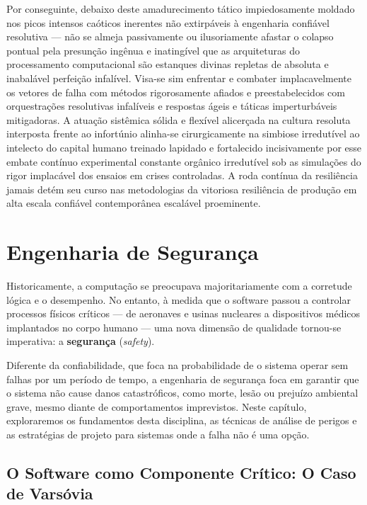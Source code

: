 \documentclass[12pt,a4paper]{report}
\begin{document}
Por conseguinte, debaixo deste amadurecimento tático impiedosamente moldado nos picos intensos caóticos inerentes não extirpáveis à engenharia confiável resolutiva — não se almeja passivamente ou ilusoriamente afastar o colapso pontual pela presunção ingênua e inatingível que as arquiteturas do processamento computacional são estanques divinas repletas de absoluta e inabalável perfeição infalível. Visa-se sim enfrentar e combater implacavelmente os vetores de falha com métodos rigorosamente afiados e preestabelecidos com orquestrações resolutivas infalíveis e respostas ágeis e táticas imperturbáveis mitigadoras. A atuação sistêmica sólida e flexível alicerçada na cultura resoluta interposta frente ao infortúnio alinha-se cirurgicamente na simbiose irredutível ao intelecto do capital humano treinado lapidado e fortalecido incisivamente por esse embate contínuo experimental constante orgânico irredutível sob as simulações do rigor implacável dos ensaios em crises controladas. A roda contínua da resiliência jamais detém seu curso nas metodologias da vitoriosa resiliência de produção em alta escala confiável contemporânea escalável proeminente.


\chapter{Engenharia de Segurança}

Historicamente, a computação se preocupava majoritariamente com a corretude lógica e o desempenho. No entanto, à medida que o software passou a controlar processos físicos críticos — de aeronaves e usinas nucleares a dispositivos médicos implantados no corpo humano — uma nova dimensão de qualidade tornou-se imperativa: a \textbf{segurança} (\emph{safety}).

Diferente da confiabilidade, que foca na probabilidade de o sistema operar sem falhas por um período de tempo, a engenharia de segurança foca em garantir que o sistema não cause danos catastróficos, como morte, lesão ou prejuízo ambiental grave, mesmo diante de comportamentos imprevistos. Neste capítulo, exploraremos os fundamentos desta disciplina, as técnicas de análise de perigos e as estratégias de projeto para sistemas onde a falha não é uma opção.

\section{O Software como Componente Crítico: O Caso de Varsóvia}
\end{document}
